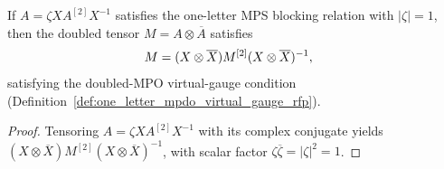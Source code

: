 \begin{lemma}
    \label{thm:blocked_gauge_phase_to_doubled_mpdo}
    \leanok
    If $A = \zeta X A^{[2]} X^{-1}$ satisfies the one-letter MPS blocking relation with $|\zeta|=1$, then the doubled tensor $M = A \otimes \overline{A}$ satisfies
    \begin{align}
        M & = (X \otimes \overline{X}) M^{[2]} (X \otimes \overline{X})^{-1},
        \notag
    \end{align}
    satisfying the doubled-MPO virtual-gauge condition
    (Definition~\ref{def:one_letter_mpdo_virtual_gauge_rfp}).
\end{lemma}
\begin{proof}
    \leanok
    Tensoring $A=\zeta X A^{[2]}X^{-1}$ with its complex conjugate yields
    $(X\otimes\overline X) M^{[2]} (X\otimes\overline X)^{-1}$, with scalar
    factor $\zeta\overline\zeta=|\zeta|^2=1$.
\end{proof}

